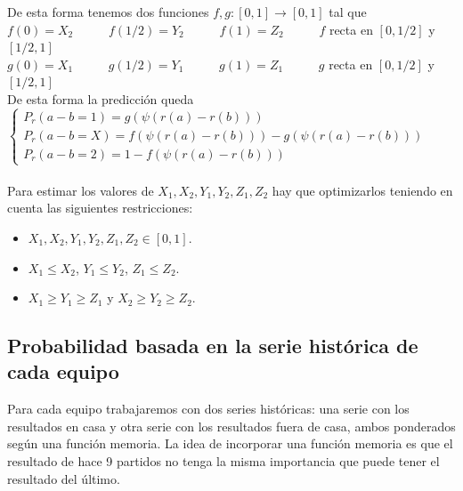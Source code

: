 De esta forma tenemos dos funciones $f,g:[0,1] \longrightarrow [0,1]$ tal que\\
$f(0)= X_{2}$ \ \ \ \ \ $f(1/2)= Y_{2}$ \ \ \ \ \ $f(1)= Z_{2}$ \ \ \ \ \ $f$ recta en $[0,1/2]$ y $[1/2,1]$\\
$g(0)= X_{1}$ \ \ \ \ \ $g(1/2)= Y_{1}$ \ \ \ \ \ $g(1)= Z_{1}$ \ \ \ \ \ $g$ recta en $[0,1/2]$ y $[1/2,1]$\\

De esta forma la predicción queda\\

$\begin{cases}
	P_{r}(a-b=1)=g(\psi (r(a)-r(b)))\\
	P_{r}(a-b=X)=f(\psi (r(a)-r(b)))-g(\psi (r(a)-r(b)))\\
	P_{r}(a-b=2)=1-f(\psi (r(a)-r(b)))
\end{cases}$
\ \\
\ \\
Para estimar los valores de $X_{1},X_{2},Y_{1},Y_{2},Z_{1},Z_{2}$ hay que optimizarlos teniendo en cuenta las siguientes restricciones:
\begin{itemize}
	\item $X_{1},X_{2},Y_{1},Y_{2},Z_{1},Z_{2} \in [0,1]$.
	\item $X_{1} \leq X_{2}$, $Y_{1} \leq Y_{2}$, $Z_{1} \leq Z_{2}$.
	\item $X_{1} \geq Y_{1} \geq Z_{1}$ y $X_{2} \geq Y_{2} \geq Z_{2}$.
\end{itemize}

\subsection{Probabilidad basada en la serie histórica de cada equipo}
Para cada equipo trabajaremos con dos series históricas: una serie con los resultados en casa y otra serie con los resultados fuera de casa, ambos ponderados según una función memoria. La idea de incorporar una función memoria es que el resultado de hace 9 partidos no tenga la misma importancia que puede tener el resultado del último.\\

\newpage

